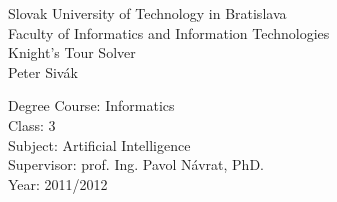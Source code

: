 \begin{center}
\thispagestyle{empty}
{\Large Slovak University of Technology in Bratislava}\\
{\Large Faculty of Informatics and Information Technologies}\\
\vspace*{8.0cm}
{\huge Knight's Tour Solver}\\[\baselineskip]
{\Large Peter Sivák}\\
\end{center}
\vspace*{6.0cm}
Degree Course: Informatics\\
Class: 3\\
Subject: Artificial Intelligence\\
Supervisor: prof. Ing. Pavol Návrat, PhD.\\
Year: 2011/2012